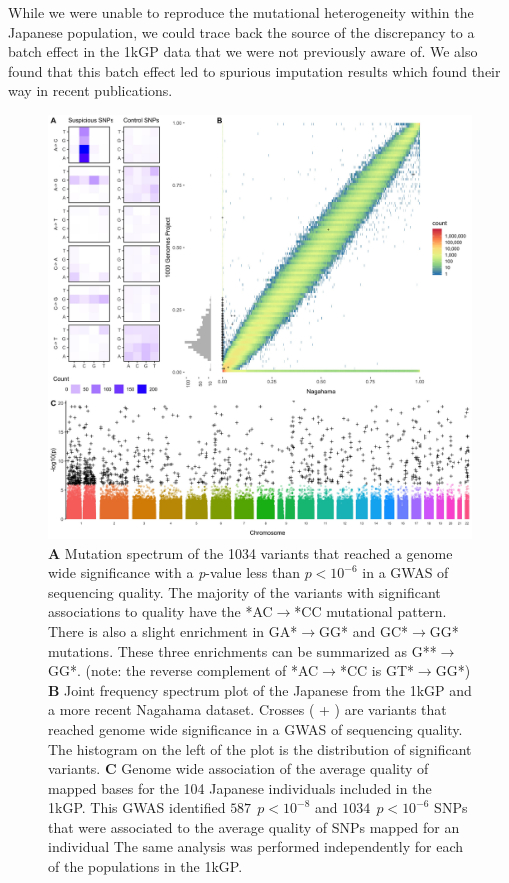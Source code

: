 \documentclass[9pt,lineno]{elife}
\begin{document}
While we were unable to reproduce the mutational heterogeneity within the Japanese population, we could trace back the source of the discrepancy to a batch effect in the 1kGP data that we were not previously aware of.
We also found that this batch effect led to spurious imputation results which found their way in recent publications.

\begin{figure}
\includegraphics[width=\hsize,keepaspectratio]{./Figures/Figure1.jpg}
\caption{
\textbf{A} 
Mutation spectrum of the 1034 variants that reached a genome wide significance with a \textit{p}-value less than $p < 10^{-6}$  in a GWAS of sequencing quality. 
The majority of the variants with significant associations to quality have the *AC${\rightarrow}$*CC mutational pattern. There is also a slight enrichment in GA*${\rightarrow}$GG* and GC*${\rightarrow}$GG* mutations. These three enrichments can be summarized as G**${\rightarrow}$GG*. (note: the reverse complement of *AC${\rightarrow}$*CC is GT*${\rightarrow}$GG*)
\textbf{B} 
Joint frequency spectrum plot of the Japanese from the 1kGP and a more recent Nagahama dataset.
Crosses ( + ) are variants that reached genome wide significance in a GWAS of sequencing quality. 
The histogram on the left of the plot is the distribution of significant variants. 
\textbf{C} 
Genome wide association of the average quality of mapped bases for the 104 Japanese individuals included in the 1kGP. This GWAS identified $587\ \  p < 10^{-8}$ and $1034\ \ p < 10^{-6}$ SNPs that were associated to the average quality of SNPs mapped for an individual
The same analysis was performed independently for each of the populations in the 1kGP. }
 \label{SFS}
\end{figure}
\end{document}
